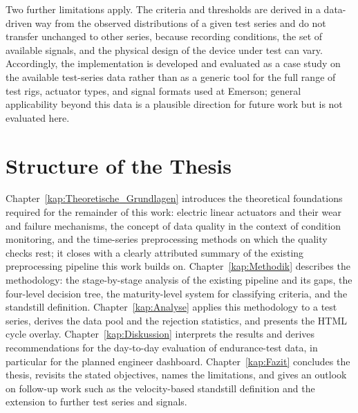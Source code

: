 Two further limitations apply. The criteria and thresholds are derived in a data-driven
way from the observed distributions of a given test series and do not transfer unchanged
to other series, because recording conditions, the set of available signals, and the
physical design of the device under test can vary. Accordingly, the implementation is
developed and evaluated as a case study on the available test-series data rather than as
a generic tool for the full range of test rigs, actuator types, and signal formats used
at Emerson; general applicability beyond this data is a plausible direction for future
work but is not evaluated here.

\section{Structure of the Thesis}
\label{sec:Einleitung_Aufbau}

Chapter~\ref{kap:Theoretische_Grundlagen} introduces the theoretical foundations required
for the remainder of this work: electric linear actuators and their wear and failure
mechanisms, the concept of data quality in the context of condition monitoring, and the
time-series preprocessing methods on which the quality checks rest; it closes with a
clearly attributed summary of the existing preprocessing pipeline this work builds on.
Chapter~\ref{kap:Methodik} describes the methodology: the stage-by-stage analysis of the
existing pipeline and its gaps, the four-level decision tree, the maturity-level system
for classifying criteria, and the standstill definition. Chapter~\ref{kap:Analyse}
applies this methodology to a test series, derives the data pool and the rejection
statistics, and presents the HTML cycle overlay. Chapter~\ref{kap:Diskussion} interprets
the results and derives recommendations for the day-to-day evaluation of endurance-test
data, in particular for the planned engineer dashboard. Chapter~\ref{kap:Fazit} concludes
the thesis, revisits the stated objectives, names the limitations, and gives an outlook on
follow-up work such as the velocity-based standstill definition and the extension to
further test series and signals.
